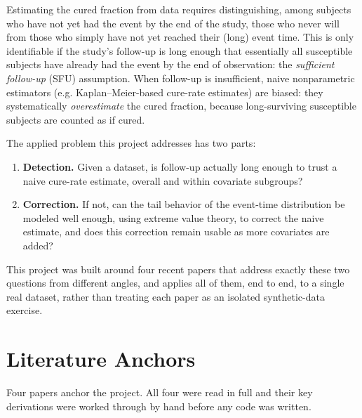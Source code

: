 \documentclass[11pt]{article}
\begin{document}
Estimating the cured fraction from data requires distinguishing, among subjects who
have not yet had the event by the end of the study, those who never will from those
who simply have not yet reached their (long) event time. This is only identifiable
if the study's follow-up is long enough that essentially all susceptible subjects
have already had the event by the end of observation: the \emph{sufficient
follow-up} (SFU) assumption. When follow-up is insufficient, naive nonparametric
estimators (e.g. Kaplan--Meier-based cure-rate estimates) are biased: they
systematically \emph{overestimate} the cured fraction, because long-surviving
susceptible subjects are counted as if cured.

The applied problem this project addresses has two parts:
\begin{enumerate}[nosep]
    \item \textbf{Detection.} Given a dataset, is follow-up actually long enough to trust
    a naive cure-rate estimate, overall and within covariate subgroups?
    \item \textbf{Correction.} If not, can the tail behavior of the event-time
    distribution be modeled well enough, using extreme value theory, to correct the
    naive estimate, and does this correction remain usable as more covariates
    are added?
\end{enumerate}

This project was built around four recent papers that address exactly these two
questions from different angles, and applies all of them, end to end, to a single
real dataset, rather than treating each paper as an isolated synthetic-data exercise.


\section{Literature Anchors}


Four papers anchor the project. All four were read in full and their key
derivations were worked through by hand before any code was written.
\end{document}
